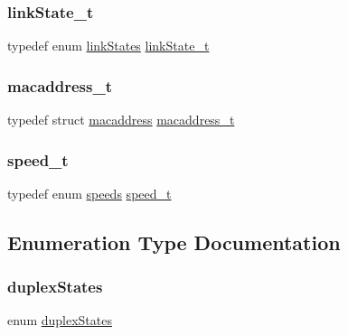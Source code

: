 \subsubsection{\texorpdfstring{linkState\_t}{linkState\_t}}
{\footnotesize\ttfamily typedef enum \mbox{\hyperlink{group__ethernet_gad146c3b2a237ecd80026880aef2cbb7e}{link\+States}}  \mbox{\hyperlink{group__ethernet_ga0e02d2c1291711df8a3ffc6f5c8aab98}{link\+State\+\_\+t}}}

\mbox{\label{group__ethernet_gacb865bcbf50a6c8cef05581bfabff373}} 
\subsubsection{\texorpdfstring{macaddress\_t}{macaddress\_t}}
{\footnotesize\ttfamily typedef struct \mbox{\hyperlink{structmacaddress}{macaddress}}  \mbox{\hyperlink{group__ethernet_gacb865bcbf50a6c8cef05581bfabff373}{macaddress\+\_\+t}}}

\mbox{\label{group__ethernet_gaf44917bbf64327b78826bc2f74266af8}} 
\subsubsection{\texorpdfstring{speed\_t}{speed\_t}}
{\footnotesize\ttfamily typedef enum \mbox{\hyperlink{group__ethernet_gad51ff69ce00ee5c869723c572db0eefd}{speeds}}  \mbox{\hyperlink{group__ethernet_gaf44917bbf64327b78826bc2f74266af8}{speed\+\_\+t}}}



\subsection{Enumeration Type Documentation}
\mbox{\label{group__ethernet_ga07afd358acdd48dc34d82f6ed379316f}} 
\subsubsection{\texorpdfstring{duplexStates}{duplexStates}}
{\footnotesize\ttfamily enum \mbox{\hyperlink{group__ethernet_ga07afd358acdd48dc34d82f6ed379316f}{duplex\+States}}}

